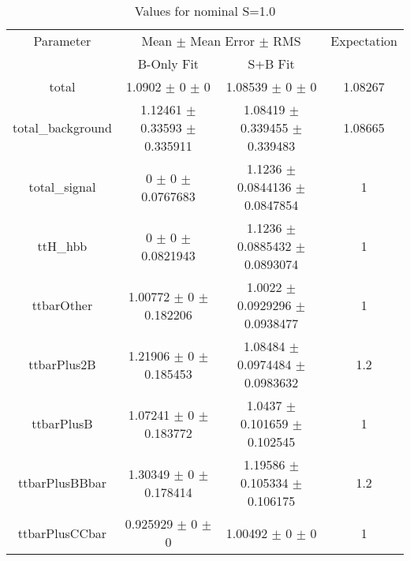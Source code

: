 \begin{table}
\centering
\caption{Values for nominal S=1.0}
\begin{tabular}{cccc}
\toprule
Parameter & \multicolumn{2}{c}{Mean $\pm$ Mean Error $\pm$ RMS} & Expectation\\
 & B-Only Fit & S+B Fit & \\
\midrule
total & \num{1.0902} $\pm$ \num{0} $\pm$ \num{0} & \num{1.08539} $\pm$ \num{0} $\pm$ \num{0} & \num{1.08267}\\
total\_background & \num{1.12461} $\pm$ \num{0.33593} $\pm$ \num{0.335911} & \num{1.08419} $\pm$ \num{0.339455} $\pm$ \num{0.339483} & \num{1.08665}\\
total\_signal & \num{0} $\pm$ \num{0} $\pm$ \num{0.0767683} & \num{1.1236} $\pm$ \num{0.0844136} $\pm$ \num{0.0847854} & \num{1}\\
ttH\_hbb & \num{0} $\pm$ \num{0} $\pm$ \num{0.0821943} & \num{1.1236} $\pm$ \num{0.0885432} $\pm$ \num{0.0893074} & \num{1}\\
ttbarOther & \num{1.00772} $\pm$ \num{0} $\pm$ \num{0.182206} & \num{1.0022} $\pm$ \num{0.0929296} $\pm$ \num{0.0938477} & \num{1}\\
ttbarPlus2B & \num{1.21906} $\pm$ \num{0} $\pm$ \num{0.185453} & \num{1.08484} $\pm$ \num{0.0974484} $\pm$ \num{0.0983632} & \num{1.2}\\
ttbarPlusB & \num{1.07241} $\pm$ \num{0} $\pm$ \num{0.183772} & \num{1.0437} $\pm$ \num{0.101659} $\pm$ \num{0.102545} & \num{1}\\
ttbarPlusBBbar & \num{1.30349} $\pm$ \num{0} $\pm$ \num{0.178414} & \num{1.19586} $\pm$ \num{0.105334} $\pm$ \num{0.106175} & \num{1.2}\\
ttbarPlusCCbar & \num{0.925929} $\pm$ \num{0} $\pm$ \num{0} & \num{1.00492} $\pm$ \num{0} $\pm$ \num{0} & \num{1}\\
\bottomrule
\end{tabular}
\end{table}